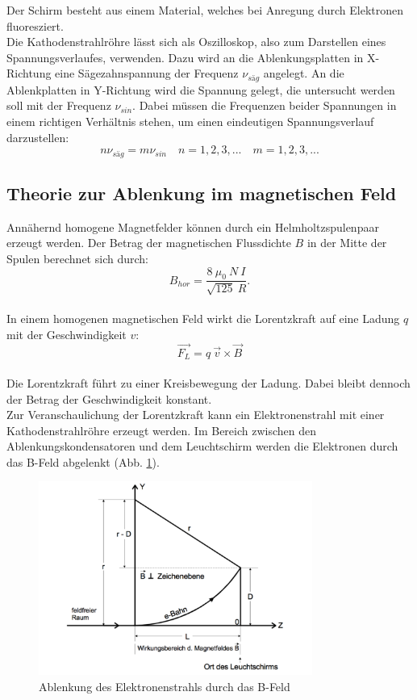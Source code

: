 Der Schirm besteht aus einem Material, welches bei Anregung durch Elektronen fluoresziert.
\\Die Kathodenstrahlröhre lässt sich als Oszilloskop, also zum Darstellen eines Spannungsverlaufes, verwenden.
Dazu wird an die Ablenkungsplatten in X-Richtung eine Sägezahnspannung der Frequenz $\nu_{säg}$ angelegt.
An die Ablenkplatten in Y-Richtung wird die Spannung gelegt, die untersucht werden soll mit der Frequenz $\nu_{sin}$.
Dabei müssen die Frequenzen beider Spannungen in einem richtigen Verhältnis stehen, um einen eindeutigen Spannungsverlauf darzustellen:
\begin{equation*}
  n\nu_{säg} = m\nu_{sin} \quad n=1,2,3,... \quad m=1,2,3,...
\end{equation*}
\FloatBarrier
\subsection{Theorie zur Ablenkung im magnetischen Feld}
Annähernd homogene Magnetfelder können durch ein Helmholtzspulenpaar erzeugt werden.
Der Betrag der magnetischen Flussdichte $B$ in der Mitte der Spulen berechnet sich durch:
\begin{equation}
B_{hor}=\frac{8 \: \mu_{0} \: N \: I }{\sqrt{125} \: R}.
\label{eqn:bhor}
\end{equation}
\\In einem homogenen magnetischen Feld wirkt die Lorentzkraft auf eine Ladung $q$ mit der Geschwindigkeit $v$:
\begin{equation*}
  \vec{F_{L}}=q\: \vec{v} \times \vec{B}
\label{eqn:lorentz}
\end{equation*}
\\Die Lorentzkraft führt zu einer Kreisbewegung der Ladung.
Dabei bleibt dennoch der Betrag der Geschwindigkeit konstant.
\\Zur Veranschaulichung der Lorentzkraft kann ein Elektronenstrahl mit einer Kathodenstrahlröhre erzeugt werden.
Im Bereich zwischen den Ablenkungskondensatoren und dem Leuchtschirm werden die Elektronen durch das B-Feld abgelenkt (Abb. \ref{fig:bfeld}).
\begin{figure}[h!]
  \centering
  \includegraphics[width=0.8\textwidth]{Magnetfeld.pdf}
  \caption{Ablenkung des Elektronenstrahls durch das B-Feld \cite{2}}
  \label{fig:bfeld}
\end{figure}
